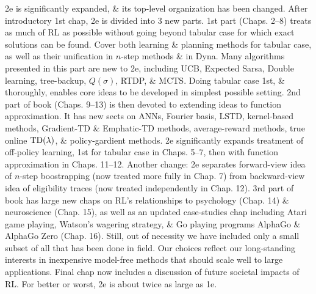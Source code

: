 \documentclass{article}
\begin{document}
\begin{itemize}
    2e is significantly expanded, \& its top-level organization has been changed. After introductory 1st chap, 2e is divided into 3 new parts. 1st part (Chaps. 2--8) treats as much of RL as possible without going beyond tabular case for which exact solutions can be found. Cover both learning \& planning methods for tabular case, as well as their unification in $n$-step methods \& in Dyna. Many algorithms presented in this part are new to 2e, including UCB, Expected Sarsa, Double learning, tree-backup, $Q(\sigma)$, RTDP, \& MCTS. Doing tabular case 1st, \& thoroughly, enables core ideas to be developed in simplest possible setting. 2nd part of book (Chaps. 9--13) is then devoted to extending ideas to function approximation. It has new sects on  ANNs, Fourier basis, LSTD, kernel-based methods, Gradient-TD \& Emphatic-TD methods, average-reward methods, true online ${\rm TD}(\lambda)$, \& policy-gardient methods. 2e significantly expands treatment of off-policy learning, 1st for tabular case in Chaps. 5--7, then with function approximation in Chaps. 11--12. Another change: 2e separates forward-view idea of $n$-step boostrapping (now treated more fully in Chap. 7) from backward-view idea of eligibility traces (now treated independently in Chap. 12). 3rd part of book has large new chaps on RL's relationships to psychology (Chap. 14) \& neuroscience (Chap. 15), as well as an updated case-studies chap including Atari game playing, Watson's wagering strategy, \& Go playing programs AlphaGo \& AlphaGo Zero (Chap. 16). Still, out of necessity we have included only a small subset of all that has been done in field. Our choices reflect our long-standing interests in inexpensive model-free methods that should scale well to large applications. Final chap now includes a discussion of future societal impacts of RL. For better or worst, 2e is about twice as large as 1e.


\end{itemize}
\end{document}
